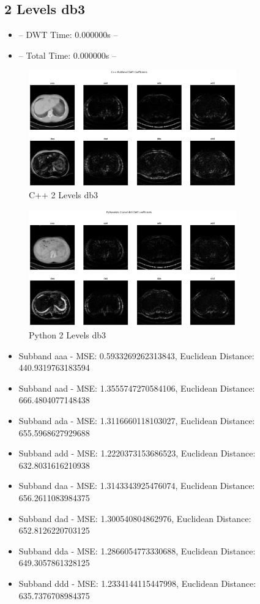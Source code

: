 \documentclass{article}
\begin{document}
\subsection{2 Levels db3}
\begin{itemize}
    \item -- DWT Time: 0.000000s --
    \item -- Total Time: 0.000000s --
\end{itemize}

\begin{figure}[H]
    \centering
    \includegraphics[width=0.8\textwidth]{assets/cpp-2-db3.png}
    \caption{C++ 2 Levels db3}
    \label{fig13}
\end{figure}

\begin{figure}[H]
    \centering
    \includegraphics[width=0.8\textwidth]{assets/py-2-db3.png}
    \caption{Python 2 Levels db3}
    \label{fig14}
\end{figure}

\begin{itemize}
    \item Subband aaa - MSE: 0.5933269262313843, Euclidean Distance: 440.9319763183594
    \item Subband aad - MSE: 1.3555747270584106, Euclidean Distance: 666.4804077148438
    \item Subband ada - MSE: 1.3116660118103027, Euclidean Distance: 655.5968627929688
    \item Subband add - MSE: 1.2220373153686523, Euclidean Distance: 632.8031616210938
    \item Subband daa - MSE: 1.3143343925476074, Euclidean Distance: 656.2611083984375
    \item Subband dad - MSE: 1.300540804862976, Euclidean Distance: 652.8126220703125
    \item Subband dda - MSE: 1.2866054773330688, Euclidean Distance: 649.3057861328125
    \item Subband ddd - MSE: 1.2334144115447998, Euclidean Distance: 635.7376708984375
\end{itemize}
\end{document}
